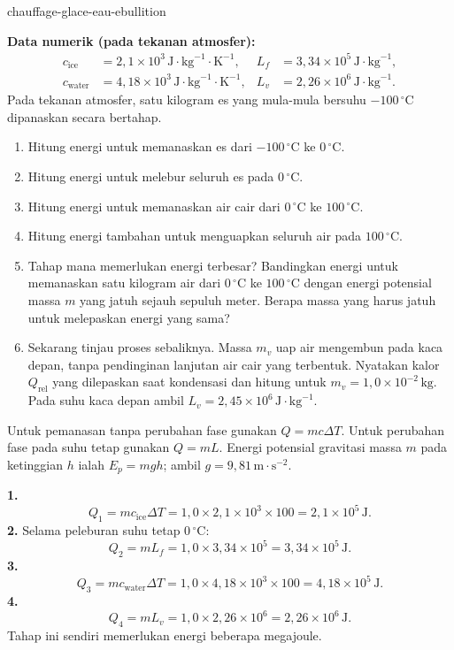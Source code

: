 
\begin{exo}{chauffage-glace-eau-ebullition}

\textbf{Data numerik (pada tekanan atmosfer):}
\[
\begin{aligned}
c_{\text{ice}} &= 2{,}1\times10^3\,\text{J}\!\cdot\!\text{kg}^{-1}\!\cdot\!\text{K}^{-1},
& L_f &= 3{,}34\times10^5\,\text{J}\!\cdot\!\text{kg}^{-1},\\
c_{\text{water}} &= 4{,}18\times10^3\,\text{J}\!\cdot\!\text{kg}^{-1}\!\cdot\!\text{K}^{-1},
& L_v &= 2{,}26\times10^6\,\text{J}\!\cdot\!\text{kg}^{-1}.
\end{aligned}
\]
Pada tekanan atmosfer, satu kilogram es yang mula-mula bersuhu $-100\,{}^\circ\text{C}$ dipanaskan secara bertahap.
\begin{enumerate}
  \item Hitung energi untuk memanaskan es dari $-100\,{}^\circ\text{C}$ ke $0\,{}^\circ\text{C}$.
  \item Hitung energi untuk melebur seluruh es pada $0\,{}^\circ\text{C}$.
  \item Hitung energi untuk memanaskan air cair dari $0\,{}^\circ\text{C}$ ke $100\,{}^\circ\text{C}$.
  \item Hitung energi tambahan untuk menguapkan seluruh air pada $100\,{}^\circ\text{C}$.
  \item Tahap mana memerlukan energi terbesar? Bandingkan energi untuk memanaskan satu kilogram air dari $0\,{}^\circ\text{C}$ ke $100\,{}^\circ\text{C}$ dengan energi potensial massa $m$ yang jatuh sejauh sepuluh meter. Berapa massa yang harus jatuh untuk melepaskan energi yang sama?
  \item Sekarang tinjau proses sebaliknya. Massa $m_v$ uap air mengembun pada kaca depan, tanpa pendinginan lanjutan air cair yang terbentuk. Nyatakan kalor $Q_{\text{rel}}$ yang dilepaskan saat kondensasi dan hitung untuk $m_v=1{,}0\times10^{-2}\,\text{kg}$. Pada suhu kaca depan ambil $L_v=2{,}45\times10^6\,\text{J}\!\cdot\!\text{kg}^{-1}$.
\end{enumerate}
\begin{indication}
Untuk pemanasan tanpa perubahan fase gunakan $Q=mc\Delta T$. Untuk perubahan fase pada suhu tetap gunakan $Q=mL$. Energi potensial gravitasi massa $m$ pada ketinggian $h$ ialah $E_p=mgh$; ambil $g=9{,}81\,\text{m}\!\cdot\!\text{s}^{-2}$.
\end{indication}
\begin{solution}
\textbf{1.}
\[
Q_1=mc_{\text{ice}}\Delta T
=1{,}0\times2{,}1\times10^3\times100=2{,}1\times10^5\,\text{J}.
\]
\textbf{2.} Selama peleburan suhu tetap $0\,{}^\circ\text{C}$:
\[
Q_2=mL_f=1{,}0\times3{,}34\times10^5=3{,}34\times10^5\,\text{J}.
\]
\textbf{3.}
\[
Q_3=mc_{\text{water}}\Delta T
=1{,}0\times4{,}18\times10^3\times100=4{,}18\times10^5\,\text{J}.
\]
\textbf{4.}
\[
Q_4=mL_v=1{,}0\times2{,}26\times10^6=2{,}26\times10^6\,\text{J}.
\]
Tahap ini sendiri memerlukan energi beberapa megajoule.


\end{solution}
\end{exo}
